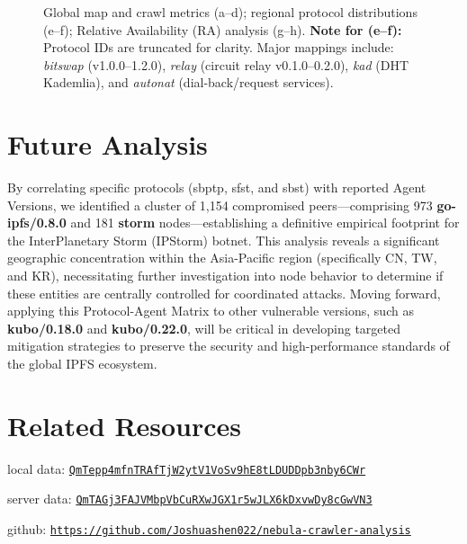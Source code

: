 \documentclass[10pt,a4paper,twocolumn]{article}
\begin{document}
\begin{figure}[t]
  \caption{%
  Global map and crawl metrics (a--d); regional protocol distributions (e--f); Relative Availability (RA) analysis (g--h). 
  \textbf{Note for (e--f):} Protocol IDs are truncated for clarity. Major mappings include: 
  \textit{bitswap} (v1.0.0--1.2.0), 
  \textit{relay} (circuit relay v0.1.0--0.2.0), 
  \textit{kad} (DHT Kademlia), 
  and \textit{autonat} (dial-back/request services).
    }
  \label{fig:global-metrics}
  \label{fig:protocol-distributions}
  \label{fig:peer-uptime-metrics}
\end{figure}

\section{Future Analysis}
By correlating specific protocols (sbptp, sfst, and sbst) with reported Agent Versions, we identified a cluster of 1,154 compromised peers—comprising 973 \textbf{go-ipfs/0.8.0} and 181 \textbf{storm} nodes—establishing a definitive empirical footprint for the InterPlanetary Storm (IPStorm) botnet. This analysis reveals a significant geographic concentration within the Asia-Pacific region (specifically CN, TW, and KR), necessitating further investigation into node behavior to determine if these entities are centrally controlled for coordinated attacks. Moving forward, applying this Protocol-Agent Matrix to other vulnerable versions, such as \textbf{kubo/0.18.0} and \textbf{kubo/0.22.0}, will be critical in developing targeted mitigation strategies to preserve the security and high-performance standards of the global IPFS ecosystem.

\section{Related Resources}
local data:
\href{https://ipfs.io/ipns/k51qzi5uqu5di60kzw2z1agw9qi4aaz8y10tqabnijl84836pwxf6vdxh773eh}{\texttt{\scriptsize QmTepp4mfnTRAfTjW2ytV1VoSv9hE8tLDUDDpb3nby6CWr}}

server data:
\href{https://ipfs.io/ipns/k51qzi5uqu5di4vvc2u836qtk0nh567xe5uz7yyrx13m3v1xzrspldqdc46k8w}{\texttt{\scriptsize QmTAGj3FAJVMbpVbCuRXwJGX1r5wJLX6kDxvwDy8cGwVN3}}

github:
\href{https://github.com/Joshuashen022/nebula-crawler-analysis}{\texttt{\scriptsize https://github.com/Joshuashen022/nebula-crawler-analysis}}
\mbox{} %
\end{document}
